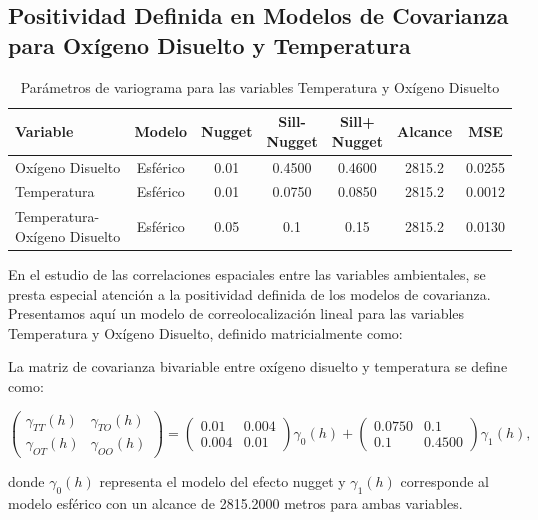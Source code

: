\subsection{ Positividad Definida en Modelos de Covarianza para Oxígeno Disuelto y Temperatura}

\begin{table}[!htb]
\centering
\caption{Parámetros de variograma para las variables Temperatura y Oxígeno Disuelto}
\label{tab:variogram_parameters}
{\small %
\begin{tabularx}{\textwidth}{Xcccccc} %
\toprule
Variable & Modelo & Nugget & \makecell{Sill-\\Nugget} & \makecell{Sill+\\Nugget} & Alcance & MSE\\
\midrule
Oxígeno Disuelto & Esférico & 0.01 & 0.4500 & 0.4600 & 2815.2 & 0.0255 \\
Temperatura & Esférico & 0.01 & 0.0750 & 0.0850 & 2815.2 & 0.0012 \\
Temperatura-Oxígeno Disuelto & Esférico & 0.05 & 0.1 & 0.15 & 2815.2 & 0.0130 \\
\bottomrule
\end{tabularx}
}
\end{table}
En el estudio de las correlaciones espaciales entre las variables ambientales, se presta especial atención a la positividad definida de los modelos de covarianza. Presentamos aquí un modelo de correolocalización lineal para las variables Temperatura y Oxígeno Disuelto, definido matricialmente como:

La matriz de covarianza bivariable entre oxígeno disuelto y temperatura se define como:

\[
\begin{pmatrix}
\gamma_{TT}(h) & \gamma_{TO}(h) \\
\gamma_{OT}(h) & \gamma_{OO}(h)
\end{pmatrix} = 
\begin{pmatrix}
0.01 & 0.004 \\
0.004 & 0.01
\end{pmatrix} \gamma_0(h) + 
\begin{pmatrix}
0.0750 & 0.1 \\
0.1 & 0.4500
\end{pmatrix} \gamma_1(h),
\]

donde \(\gamma_0(h)\) representa el modelo del efecto nugget y \(\gamma_1(h)\) corresponde al modelo esférico con un alcance de 2815.2000 metros para ambas variables.

